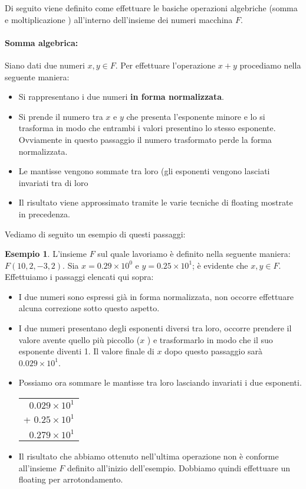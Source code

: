 \documentclass[12pt, a4paper]{book}
\theoremstyle{definition}
\newtheorem{exmp}{Esempio}[section]
\begin{document}
\begin{flushleft}


Di seguito viene definito come effettuare le basiche operazioni algebriche (somma e moltiplicazione ) all'interno dell'insieme dei numeri macchina $F$.

\paragraph{Somma algebrica: } Siano dati due numeri $x, y \in F$.  Per effettuare l'operazione $x + y$ procediamo nella seguente maniera: \\
\begin{itemize}
	\item  Si rappresentano i due numeri \textbf{in forma normalizzata}. 
	\item  Si prende il numero tra $x$ e $y$ che presenta l'esponente minore e lo si trasforma in modo che entrambi i valori presentino lo stesso esponente.  Ovviamente in questo passaggio il numero trasformato perde la forma normalizzata. 
	\item  Le mantisse vengono sommate tra loro (gli esponenti vengono lasciati invariati tra di loro 
	\item  Il risultato viene approssimato tramite le varie tecniche di floating mostrate in precedenza. 
\end{itemize}

Vediamo di seguito un esempio di questi passaggi: 

\begin{exmp}
L'insieme $F$ sul quale lavoriamo è definito nella seguente maniera: $F(10, 2, -3,2)$.  Sia $x = 0.29 \times 10^{0}$  e $ y = 0.25 \times 10^{1}$; è evidente che $x,y \in F$.  
Effettuiamo i passaggi elencati qui sopra: 
\begin{itemize}
	\item I due numeri sono espressi già in forma normalizzata, non occorre effettuare alcuna correzione sotto questo aspetto.
	\item I due numeri presentano degli esponenti diversi tra loro, occorre prendere il valore avente quello più piccollo ($x$ ) e trasformarlo in modo che il suo esponente diventi 1. Il valore finale di $x$ dopo questo passaggio sarà $0.029 \times 10^{1}$.  
	\item Possiamo ora sommare le mantisse tra loro lasciando invariati i due esponenti. \\
	\vspace{1em}
	 \begin{tabular}{r}
    $0.029 \times 10^{1}$ \\ 
    + $0.25 \times 10^{1}$  \\ 
     \hline
     $0.279 \times 10^{1}$
 \end{tabular}
 	\item Il risultato che abbiamo ottenuto nell'ultima operazione non è conforme all'insieme $F$ definito all'inizio dell'esempio. Dobbiamo quindi effettuare un floating per arrotondamento.
 	

\end{itemize}
\end{exmp}
\end{flushleft}
\end{document}
